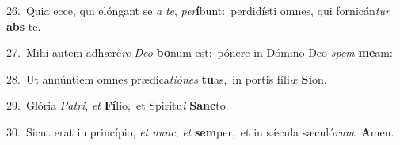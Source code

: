 {\numbfont\textcolor{\numbcolor}{26.}}~Quia ecce, qui elóngant se \textit{a} \textit{te}\-, \textit{per}\-\textbf{í}bunt:~\star perdidísti omnes, qui fornicán\textit{tur} \textbf{abs} te.\par
{\numbfont\textcolor{\numbcolor}{27.}}~Mihi autem adhæré\textit{re} \textit{De}\-\textit{o} \textbf{bo}\-num est:~\star pónere in Dómino Deo \textit{spem} \textbf{me}\-am:\par
{\numbfont\textcolor{\numbcolor}{28.}}~Ut annúntiem omnes prædica\-\textit{ti}\-\textit{ó}\textit{nes} \textbf{tu}\-as,~\star in portis fíli\textit{æ} \textbf{Si}\-on.\par
{\numbfont\textcolor{\numbcolor}{29.}}~Glória \textit{Pa}\-\textit{tri}, \textit{et} \textbf{Fí}\-lio,~\star et Spirítu\textit{i} \textbf{Sanc}\-to.\par
{\numbfont\textcolor{\numbcolor}{30.}}~Sicut erat in princípio, \textit{et} \textit{nunc}\-, \textit{et} \textbf{sem}\-per,~\star et in sǽcula sæculó\-\textit{rum}\-. \textbf{A}\-men.\par
